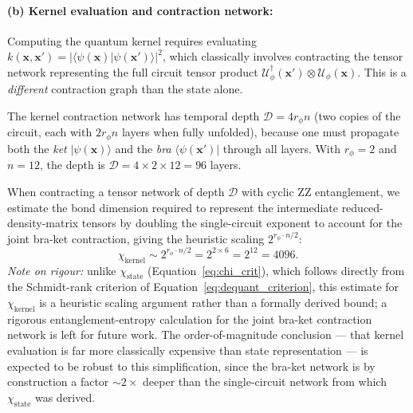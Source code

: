 \documentclass[11pt,a4paper, english]{book}
\theoremstyle{plain}
\theoremstyle{definition}
\numberwithin{equation}{chapter}
\numberwithin{figure}{chapter}
\numberwithin{table}{chapter}
\begin{document}
\paragraph{(b) Kernel evaluation and contraction network:} Computing the quantum kernel
requires evaluating $k(\mathbf{x}, \mathbf{x}') = |\langle\psi(\mathbf{x})|\psi(\mathbf{x}')\rangle|^2$,
which classically involves contracting the tensor network representing the full circuit
tensor product $\mathcal{U}_\phi^\dagger(\mathbf{x}') \otimes \mathcal{U}_\phi(\mathbf{x})$. This is a \emph{different}
contraction graph than the state alone.

The kernel contraction network has temporal depth $\mathcal{D} = 4r_\phi n$ (two copies of the circuit,
each with $2r_\phi n$ layers when fully unfolded), because one must propagate both the 
\emph{ket} $|\psi(\mathbf{x})\rangle$ and the \emph{bra} $\langle\psi(\mathbf{x}')|$ through all
layers. With $r_\phi = 2$ and $n = 12$, the depth is $\mathcal{D} = 4 \times 2 \times 12 = 96$ layers.

When contracting a tensor network of depth $\mathcal{D}$ with cyclic ZZ entanglement,
we estimate the bond dimension required to represent the intermediate
reduced-density-matrix tensors by doubling the single-circuit exponent
to account for the joint bra-ket contraction, giving the heuristic
scaling $2^{r_\phi \cdot n/2}$:
\begin{equation}
  \label{eq:chi_kernel}
  \chi_\mathrm{kernel} \sim 2^{r_\phi \cdot n/2} = 2^{2 \times 6} = 2^{12} = 4096.
\end{equation}
\noindent\textit{Note on rigour:} unlike $\chi_\mathrm{state}$
(Equation~\ref{eq:chi_crit}), which follows directly from the Schmidt-rank
criterion of Equation~\eqref{eq:dequant_criterion}, this estimate for
$\chi_\mathrm{kernel}$ is a heuristic scaling argument rather than a
formally derived bound; a rigorous entanglement-entropy calculation
for the joint bra-ket contraction network is left for future work.
The order-of-magnitude conclusion --- that kernel evaluation is far
more classically expensive than state representation --- is expected
to be robust to this simplification, since the bra-ket network is by
construction a factor $\sim2\times$ deeper than the single-circuit
network from which $\chi_\mathrm{state}$ was derived.
\end{document}
